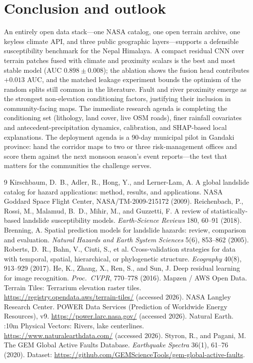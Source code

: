 \documentclass[11pt,a4paper]{article}
\begin{document}
\section{Conclusion and outlook}
\label{sec:conclusion}
An entirely open data stack---one NASA catalog, one open terrain archive, one
keyless climate API, and three public geographic layers---supports a
defensible susceptibility benchmark for the Nepal Himalaya. A compact residual
CNN over terrain patches fused with climate and proximity scalars is the best
and most stable model (AUC $0.898 \pm 0.008$); the ablation shows the fusion
head contributes $+0.013$ AUC, and the matched leakage experiment bounds the
optimism of the random splits still common in the literature. Fault and river
proximity emerge as the strongest non-elevation conditioning factors,
justifying their inclusion in community-facing maps. The immediate research
agenda is completing the conditioning set (lithology, land cover, live OSM
roads), finer rainfall covariates and antecedent-precipitation dynamics,
calibration, and SHAP-based local explanations. The deployment agenda is a
90-day municipal pilot in Gandaki province: hand the corridor maps to two or
three risk-management offices and score them against the next monsoon
season's event reports---the test that matters for the communities the
challenge serves.

\begin{thebibliography}{9}\small
{} Kirschbaum, D.~B., Adler, R., Hong, Y., and
Lerner-Lam, A. \newblock A global landslide catalog for hazard applications:
method, results, and applications. \newblock NASA Goddard Space Flight Center,
NASA/TM-2009-215172 (2009).
 Reichenbach, P., Rossi, M., Malamud, B.~D., Mihir,
M., and Guzzetti, F. \newblock A review of statistically-based landslide
susceptibility models. \newblock \emph{Earth-Science Reviews} 180, 60--91
(2018).
 Brenning, A. \newblock Spatial prediction models for
landslide hazards: review, comparison and evaluation. \newblock \emph{Natural
Hazards and Earth System Sciences} 5(6), 853--862 (2005).
 Roberts, D.~R., Bahn, V., Ciuti, S., et al.
\newblock Cross-validation strategies for data with temporal, spatial,
hierarchical, or phylogenetic structure. \newblock \emph{Ecography} 40(8),
913--929 (2017).
 He, K., Zhang, X., Ren, S., and Sun, J. \newblock Deep
residual learning for image recognition. \newblock \emph{Proc.\ CVPR},
770--778 (2016).
 Mapzen / AWS Open Data. \newblock Terrain Tiles: Terrarium
elevation raster tiles. \newblock
\url{https://registry.opendata.aws/terrain-tiles/} (accessed 2026).
 NASA Langley Research Center. \newblock POWER Data Services
(Prediction of Worldwide Energy Resources), v9. \newblock
\url{https://power.larc.nasa.gov/} (accessed 2026).
 Natural Earth. :10m Physical Vectors:
Rivers, lake centerlines. \newblock \url{https://www.naturalearthdata.com/}
(accessed 2026).
 Styron, R., and Pagani, M. \newblock The GEM Global Active
Faults Database. \newblock \emph{Earthquake Spectra} 36(1), 61--76 (2020).
Dataset: \url{https://github.com/GEMScienceTools/gem-global-active-faults}.
\end{thebibliography}
\end{document}
